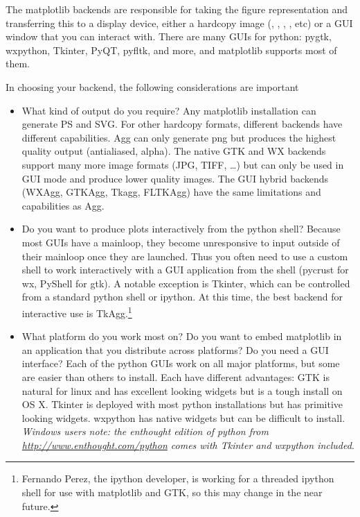 \documentclass[]{book}
\begin{document}
The matplotlib backends are responsible for taking the figure
representation and transferring this to a display device, either a
hardcopy image (, , ,
, etc) or a GUI window that you can interact with.  There
are many GUIs for python: pygtk, wxpython, Tkinter, PyQT, pyfltk, and
more, and matplotlib supports most of them.  

In choosing your backend, the following considerations are important

\begin{itemize}
\item What kind of output do you require?  Any matplotlib installation
  can generate PS and SVG.  For other hardcopy formats, different
  backends have different capabilities.  Agg can only generate png but
  produces the highest quality output (antialiased, alpha).  The
  native GTK and WX backends support many more image formats (JPG,
  TIFF, \dots) but can only be used in GUI mode and produce lower
  quality images.  The GUI hybrid backends (WXAgg, GTKAgg, Tkagg,
  FLTKAgg) have the same limitations and capabilities as Agg.
  
\item Do you want to produce plots interactively from the python
  shell?  Because most GUIs have a mainloop, they become unresponsive
  to input outside of their mainloop once they are launched.  Thus you
  often need to use a custom shell to work interactively with a GUI
  application from the shell (pycrust for wx, PyShell for gtk).  A
  notable exception is Tkinter, which can be controlled from a
  standard python shell or ipython.  At this time, the best backend
  for interactive use is TkAgg.\footnote{Fernando Perez, the
  ipython developer, is working for a threaded ipython shell for use
  with matplotlib and GTK, so this may change in the near future.}

\item What platform do you work most on?  Do you want to embed
  matplotlib in an application that you distribute across platforms?
  Do you need a GUI interface?  Each of the python GUIs work on all
  major platforms, but some are easier than others to install.  Each
  have different advantages: GTK is natural for linux and has
  excellent looking widgets but is a tough install on OS X.  Tkinter
  is deployed with most python installations but has primitive looking
  widgets.  wxpython has native widgets but can be difficult to
  install.  \textit{Windows users note: the enthought edition of
  python from \url{http://www.enthought.com/python} comes with Tkinter
  and wxpython included}.
  

\end{itemize}
\end{document}
